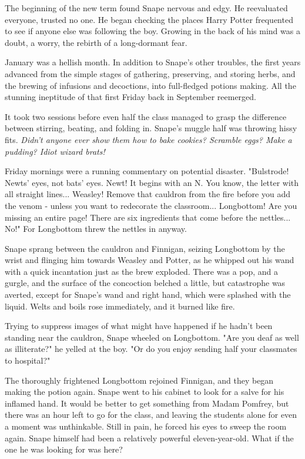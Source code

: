\documentclass[a4paper,11pt]{article}
\begin{document}
The beginning of the new term found Snape nervous and edgy. He reevaluated everyone, trusted no one. He began checking the places Harry Potter frequented to see if anyone else was following the boy. Growing in the back of his mind was a doubt, a worry, the rebirth of a long-dormant fear.

January was a hellish month. In addition to Snape's other troubles, the first years advanced from the simple stages of gathering, preserving, and storing herbs, and the brewing of infusions and decoctions, into full-fledged potions making. All the stunning ineptitude of that first Friday back in September reemerged.

It took two sessions before even half the class managed to grasp the difference between stirring, beating, and folding in. Snape's muggle half was throwing hissy fits. \emph{Didn't anyone ever show them how to bake cookies? Scramble eggs? Make a pudding? Idiot wizard brats!}

Friday mornings were a running commentary on potential disaster. "Bulstrode! Newts' eyes, not bats' eyes. Newt! It begins with an N. You know, the letter with all straight lines... Weasley! Remove that cauldron from the fire before you add the venom - unless you want to redecorate the classroom... Longbottom! Are you missing an entire page! There are six ingredients that come before the nettles... No!" For Longbottom threw the nettles in anyway.

Snape sprang between the cauldron and Finnigan, seizing Longbottom by the wrist and flinging him towards Weasley and Potter, as he whipped out his wand with a quick incantation just as the brew exploded. There was a pop, and a gurgle, and the surface of the concoction belched a little, but catastrophe was averted, except for Snape's wand and right hand, which were splashed with the liquid. Welts and boils rose immediately, and it burned like fire.

Trying to suppress images of what might have happened if he hadn't been standing near the cauldron, Snape wheeled on Longbottom. "Are you deaf as well as illiterate?" he yelled at the boy. "Or do you enjoy sending half your classmates to hospital?"

The thoroughly frightened Longbottom rejoined Finnigan, and they began making the potion again. Snape went to his cabinet to look for a salve for his inflamed hand. It would be better to get something from Madam Pomfrey, but there was an hour left to go for the class, and leaving the students alone for even a moment was unthinkable. Still in pain, he forced his eyes to sweep the room again. Snape himself had been a relatively powerful eleven-year-old. What if the one he was looking for was here?
\end{document}
